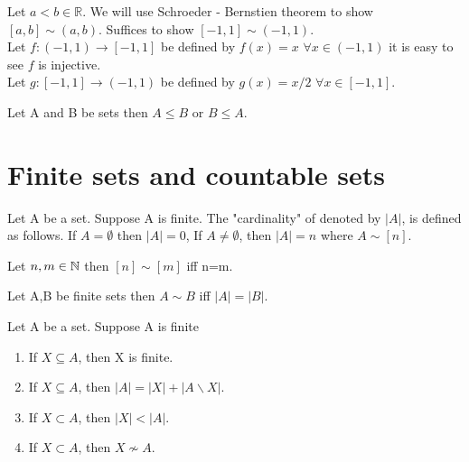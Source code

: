 \documentclass[a4paper,english,12pt]{article}   	%
\begin{document}
\begin{exmp} Let $a<b \in \mathbb{R}$. We will use Schroeder - Bernstien theorem to show $[a,b] \sim (a,b)$. Suffices to show $[-1,1] \sim (-1,1)$.\\
Let $f \colon (-1,1) \to [-1,1]$ be defined by $f(x)=x$ $\forall x \in (-1,1)$ it is easy to see $f$ is injective.\\
Let $g \colon [-1,1] \to (-1,1)$ be defined by $g(x)=x/2$ $\forall x \in [-1,1]$.
\end{exmp}
\begin{thm} Let A and B be sets then $A \leq B $ or $B \leq A$.
\end{thm}

\section{Finite sets and countable sets}
\begin{defn} Let A be a set. Suppose A is finite. The "cardinality" of denoted by $|A|$, is defined as follows. If $A= \emptyset$ then $|A|=0$, If $A \neq \emptyset$, then $|A|=n$ where $A \sim [n]$.
\end{defn}
\begin{lem} Let $n,m \in \mathbb{N}$ then $[n] \sim [m]$ iff n=m.
\end{lem}
\begin{cor} Let A,B be finite sets then $A \sim B$ iff $|A|=|B|$.
\end{cor}
\begin{thm} Let A be a set. Suppose A is finite
\begin{enumerate}
\item If $X \subseteq A$, then X is finite.
\item If $X \subseteq A$, then $|A|=|X|+|A\backslash X|$.
\item If $X \subset A$, then $|X|<|A|$.
\item If $X \subset A$, then $X \nsim A$.
\end{enumerate}
\end{thm}
\end{document}
